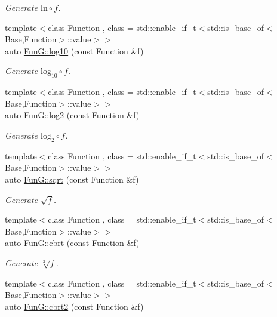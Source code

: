 \begin{DoxyCompactItemize}
\begin{DoxyCompactList}\small\item\em Generate $ \mathrm{ln}\circ f $. \end{DoxyCompactList}\item 
{\footnotesize template$<$class Function , class  = std\+::enable\+\_\+if\+\_\+t$<$std\+::is\+\_\+base\+\_\+of$<$\+Base,\+Function$>$\+::value$>$$>$ }\\auto \hyperlink{group__CMathGroup_gae9506f4e0e6fad4f756f636044697bfe}{Fun\+G\+::log10} (const Function \&f)
\begin{DoxyCompactList}\small\item\em Generate $ \mathrm{log}_{10}\circ f $. \end{DoxyCompactList}\item 
{\footnotesize template$<$class Function , class  = std\+::enable\+\_\+if\+\_\+t$<$std\+::is\+\_\+base\+\_\+of$<$\+Base,\+Function$>$\+::value$>$$>$ }\\auto \hyperlink{group__CMathGroup_gacd6be7e9de7bbd54c852f0acf0c7d2c2}{Fun\+G\+::log2} (const Function \&f)
\begin{DoxyCompactList}\small\item\em Generate $ \mathrm{log}_{2}\circ f $. \end{DoxyCompactList}\item 
{\footnotesize template$<$class Function , class  = std\+::enable\+\_\+if\+\_\+t$<$std\+::is\+\_\+base\+\_\+of$<$\+Base,\+Function$>$\+::value$>$$>$ }\\auto \hyperlink{group__CMathGroup_ga136c890475e48f88469a737d95368d05}{Fun\+G\+::sqrt} (const Function \&f)
\begin{DoxyCompactList}\small\item\em Generate $ \sqrt{f} $. \end{DoxyCompactList}\item 
{\footnotesize template$<$class Function , class  = std\+::enable\+\_\+if\+\_\+t$<$std\+::is\+\_\+base\+\_\+of$<$\+Base,\+Function$>$\+::value$>$$>$ }\\auto \hyperlink{group__CMathGroup_gaa7f2552adfb8ec41aeb685adddd8bf98}{Fun\+G\+::cbrt} (const Function \&f)
\begin{DoxyCompactList}\small\item\em Generate $ \sqrt[3]{f} $. \end{DoxyCompactList}\item 
{\footnotesize template$<$class Function , class  = std\+::enable\+\_\+if\+\_\+t$<$std\+::is\+\_\+base\+\_\+of$<$\+Base,\+Function$>$\+::value$>$$>$ }\\auto \hyperlink{group__CMathGroup_gafd27322fb64c6df3366f384c93819a06}{Fun\+G\+::cbrt2} (const Function \&f)

\end{DoxyCompactItemize}
